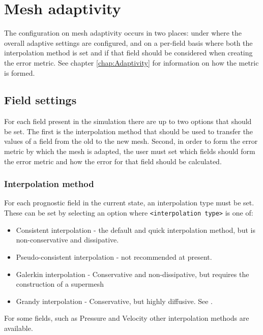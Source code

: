 \section{Mesh adaptivity} \label{sec:config_adapt}

The configuration on mesh adaptivity occurs in two places: under  where 
the overall adaptive settings are configured, and on a per-field basis where both the interpolation
method is set and if that field should be considered when creating the error metric. See chapter 
\ref{chap:Adaptivity} for information on how the metric is formed.

\subsection{Field settings}

For each field present in the simulation there are up to two options that should be set. The first
is the interpolation method that should be used to transfer the values of a field from the old to the new mesh.
Second, in order to form the error metric by which the mesh is adapted, the user must set which fields
should form the error metric and how the error for that field should be calculated.

\subsubsection{Interpolation method} \label{sec:config_adapt_interp}

For each prognostic field in the current state, an interpolation type must be set. These can be set by selecting an
option  where \texttt{<interpolation type>} is one of:
\begin{itemize}
\item Consistent interpolation - the default and quick interpolation method, but is non-conservative and dissipative.
\item Pseudo-consistent interpolation - not recommended at present.
\item Galerkin interpolation - Conservative and non-dissipative, but requires the construction of a supermesh \citep{farrell2009a,farrell2010a}
\item Grandy interpolation - Conservative, but highly diffusive. See \citet{grandy1999}.
\end{itemize}

For some fields, such as Pressure and Velocity other interpolation methods are available.

